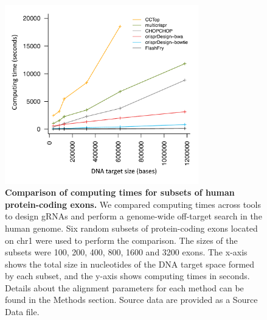 \documentclass[pdftex,english,10pt]{article}
\begin{document}
\begin{figure}[!h]
\centering
\includegraphics[width=0.75\textwidth]{../figures/speed/speedAcrossTools.pdf}
  \caption{\textbf{Comparison of computing times for subsets of human protein-coding exons.} 
We compared computing times across tools to design gRNAs and perform a genome-wide off-target search in the human genome. 
Six random subsets of protein-coding exons located on chr1 were used to perform the comparison. The sizes of the subsets were 100, 200, 400, 800, 1600 and 3200 exons.
The x-axis shows the total size in nucleotides of the DNA target space formed by each subset, and the y-axis shows computing times in seconds. Details about the alignment parameters for each method can be found in the Methods section. Source data are provided as a Source Data file.}
  \label{suppfig:speed}
\end{figure}
\end{document}
